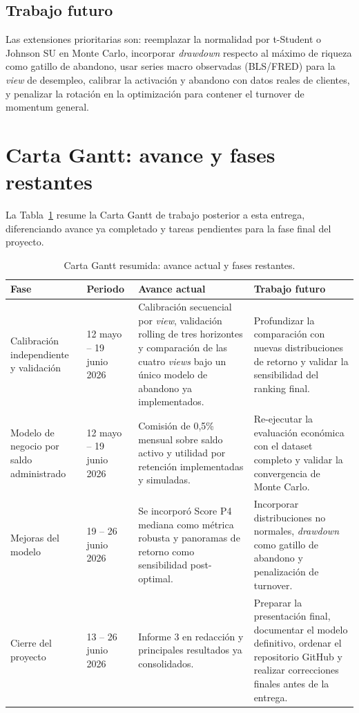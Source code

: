 \subsection{Trabajo futuro}

Las extensiones prioritarias son: reemplazar la normalidad por t-Student o
Johnson SU en Monte Carlo, incorporar \textit{drawdown} respecto al m\'aximo de
riqueza como gatillo de abandono, usar series macro observadas (BLS/FRED) para
la \textit{view} de desempleo, calibrar la activaci\'on y abandono con datos
reales de clientes, y penalizar la rotaci\'on en la optimizaci\'on para contener
el turnover de momentum general.

\section{Carta Gantt: avance y fases restantes}

La Tabla~\ref{tab:plan_trabajo_futuro} resume la Carta Gantt de trabajo
posterior a esta entrega, diferenciando avance ya completado y tareas pendientes
para la fase final del proyecto.

\begin{table}[h]
\centering
\caption{Carta Gantt resumida: avance actual y fases restantes.}
\label{tab:plan_trabajo_futuro}
\scriptsize
\begin{tabular}{@{}p{}p{}p{}p{}@{}}
\toprule
Fase & Periodo & Avance actual & Trabajo futuro \\
\midrule
Calibraci\'on independiente y validaci\'on &
12 mayo -- 19 junio 2026 &
Calibraci\'on secuencial por \textit{view}, validaci\'on rolling de tres horizontes y comparaci\'on de las cuatro \textit{views} bajo un \'unico modelo de abandono ya implementados. &
Profundizar la comparaci\'on con nuevas distribuciones de retorno y validar la sensibilidad del ranking final. \\
\addlinespace

Modelo de negocio por saldo administrado &
12 mayo -- 19 junio 2026 &
Comisi\'on de 0,5\% mensual sobre saldo activo y utilidad por retenci\'on implementadas y simuladas. &
Re-ejecutar la evaluaci\'on econ\'omica con el dataset completo y validar la convergencia de Monte Carlo. \\
\addlinespace

Mejoras del modelo &
19 -- 26 junio 2026 &
Se incorpor\'o Score P4 mediana como m\'etrica robusta y panoramas de retorno como sensibilidad post-optimal. &
Incorporar distribuciones no normales, \textit{drawdown} como gatillo de abandono y penalizaci\'on de turnover. \\
\addlinespace

Cierre del proyecto &
13 -- 26 junio 2026 &
Informe 3 en redacci\'on y principales resultados ya consolidados. &
Preparar la presentaci\'on final, documentar el modelo definitivo, ordenar el repositorio GitHub y realizar correcciones finales antes de la entrega. \\
\bottomrule
\end{tabular}
\end{table}
